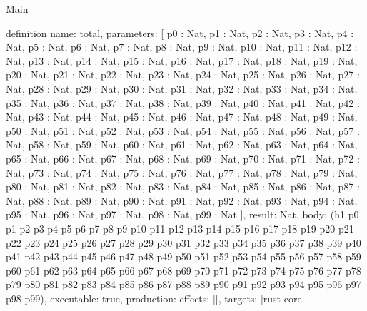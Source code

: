 \begin{lexlean}{Main}
\begin{semanticmodule}
definition{
  name: total,
  parameters: [
    p0 : Nat,
    p1 : Nat,
    p2 : Nat,
    p3 : Nat,
    p4 : Nat,
    p5 : Nat,
    p6 : Nat,
    p7 : Nat,
    p8 : Nat,
    p9 : Nat,
    p10 : Nat,
    p11 : Nat,
    p12 : Nat,
    p13 : Nat,
    p14 : Nat,
    p15 : Nat,
    p16 : Nat,
    p17 : Nat,
    p18 : Nat,
    p19 : Nat,
    p20 : Nat,
    p21 : Nat,
    p22 : Nat,
    p23 : Nat,
    p24 : Nat,
    p25 : Nat,
    p26 : Nat,
    p27 : Nat,
    p28 : Nat,
    p29 : Nat,
    p30 : Nat,
    p31 : Nat,
    p32 : Nat,
    p33 : Nat,
    p34 : Nat,
    p35 : Nat,
    p36 : Nat,
    p37 : Nat,
    p38 : Nat,
    p39 : Nat,
    p40 : Nat,
    p41 : Nat,
    p42 : Nat,
    p43 : Nat,
    p44 : Nat,
    p45 : Nat,
    p46 : Nat,
    p47 : Nat,
    p48 : Nat,
    p49 : Nat,
    p50 : Nat,
    p51 : Nat,
    p52 : Nat,
    p53 : Nat,
    p54 : Nat,
    p55 : Nat,
    p56 : Nat,
    p57 : Nat,
    p58 : Nat,
    p59 : Nat,
    p60 : Nat,
    p61 : Nat,
    p62 : Nat,
    p63 : Nat,
    p64 : Nat,
    p65 : Nat,
    p66 : Nat,
    p67 : Nat,
    p68 : Nat,
    p69 : Nat,
    p70 : Nat,
    p71 : Nat,
    p72 : Nat,
    p73 : Nat,
    p74 : Nat,
    p75 : Nat,
    p76 : Nat,
    p77 : Nat,
    p78 : Nat,
    p79 : Nat,
    p80 : Nat,
    p81 : Nat,
    p82 : Nat,
    p83 : Nat,
    p84 : Nat,
    p85 : Nat,
    p86 : Nat,
    p87 : Nat,
    p88 : Nat,
    p89 : Nat,
    p90 : Nat,
    p91 : Nat,
    p92 : Nat,
    p93 : Nat,
    p94 : Nat,
    p95 : Nat,
    p96 : Nat,
    p97 : Nat,
    p98 : Nat,
    p99 : Nat
  ],
  result: Nat,
  body: (h1 p0 p1 p2 p3 p4 p5 p6 p7 p8 p9 p10 p11 p12 p13 p14 p15 p16 p17 p18 p19 p20 p21 p22 p23 p24 p25 p26 p27 p28 p29 p30 p31 p32 p33 p34 p35 p36 p37 p38 p39 p40 p41 p42 p43 p44 p45 p46 p47 p48 p49 p50 p51 p52 p53 p54 p55 p56 p57 p58 p59 p60 p61 p62 p63 p64 p65 p66 p67 p68 p69 p70 p71 p72 p73 p74 p75 p76 p77 p78 p79 p80 p81 p82 p83 p84 p85 p86 p87 p88 p89 p90 p91 p92 p93 p94 p95 p96 p97 p98 p99),
  executable: true,
  production: {effects: [], targets: [rust-core]}
}
\end{semanticmodule}
\end{lexlean}

